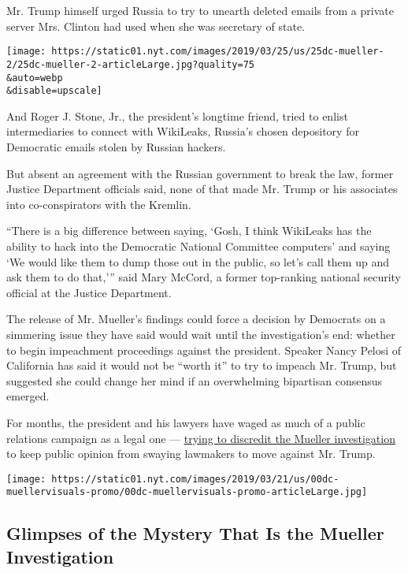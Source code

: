 Mr. Trump himself urged Russia to try to unearth deleted emails from a
private server Mrs. Clinton had used when she was secretary of state.

\texttt{[image: https://static01.nyt.com/images/2019/03/25/us/25dc-mueller-2/25dc-mueller-2-articleLarge.jpg?quality=75\\\&auto=webp\\\&disable=upscale]}

And Roger J. Stone, Jr., the president's longtime friend, tried to
enlist intermediaries to connect with WikiLeaks, Russia's chosen
depository for Democratic emails stolen by Russian hackers.

But absent an agreement with the Russian government to break the law,
former Justice Department officials said, none of that made Mr. Trump or
his associates into co-conspirators with the Kremlin.

``There is a big difference between saying, `Gosh, I think WikiLeaks has
the ability to hack into the Democratic National Committee computers'
and saying `We would like them to dump those out in the public, so let's
call them up and ask them to do that,''' said Mary McCord, a former
top-ranking national security official at the Justice Department.

The release of Mr. Mueller's findings could force a decision by
Democrats on a simmering issue they have said would wait until the
investigation's end: whether to begin impeachment proceedings against
the president. Speaker Nancy Pelosi of California has said it would not
be ``worth it'' to try to impeach Mr. Trump, but suggested she could
change her mind if an overwhelming bipartisan consensus emerged.

For months, the president and his lawyers have waged as much of a public
relations campaign as a legal one ---
\href{https://www.nytimes.com/2019/02/19/us/politics/trump-investigations.html}{trying
to discredit the Mueller investigation} to keep public opinion from
swaying lawmakers to move against Mr. Trump.

\href{https://www.nytimes.com/interactive/2019/03/21/us/the-mueller-report-photos.html}{}

\texttt{[image: https://static01.nyt.com/images/2019/03/21/us/00dc-muellervisuals-promo/00dc-muellervisuals-promo-articleLarge.jpg]}

\hypertarget{glimpses-of-the-mystery-that-is-the-mueller-investigation}{%
\subsection{Glimpses of the Mystery That Is the Mueller
Investigation}\label{glimpses-of-the-mystery-that-is-the-mueller-investigation}}

